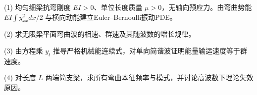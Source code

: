 (1) 均匀细梁抗弯刚度 \(EI>0\)、单位长度质量 \(\mu>0\)，无轴向预应力。由弯曲势能 \(EI\int y_{xx}^2dx/2\) 与横向动能建立Euler–Bernoulli振动PDE。

(2) 求无限梁平面弯曲波的相速、群速及其随波数的增长规律。

(3) 由方程乘 \(y_t\) 推导严格机械能连续式，对单向简谐波证明能量输运速度等于群速度。

(4) 对长度 \(L\) 两端简支梁，求所有弯曲本征频率与模式，并讨论高波数下理论失效原因。

